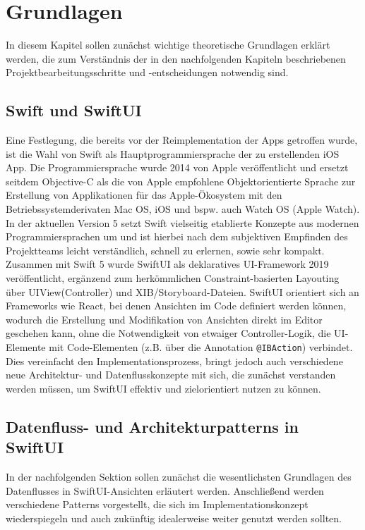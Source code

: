 \chapter{Grundlagen}\label{ch:grundlagen}

In diesem Kapitel sollen zunächst wichtige theoretische Grundlagen erklärt werden, die zum Verständnis der in den nachfolgenden Kapiteln beschriebenen Projektbearbeitungsschritte und -entscheidungen notwendig sind.

\section{Swift und SwiftUI}

Eine Festlegung, die bereits vor der Reimplementation der Apps getroffen wurde, ist die Wahl von Swift als Hauptprogrammiersprache der zu erstellenden iOS App. Die Programmiersprache wurde 2014 von Apple veröffentlicht und ersetzt seitdem Objective-C als die von Apple empfohlene Objektorientierte Sprache zur Erstellung von Applikationen für das Apple-Ökosystem mit den Betriebssystemderivaten Mac OS, iOS und bspw. auch Watch OS (Apple Watch). In der aktuellen Version 5 setzt Swift vielseitig etablierte Konzepte aus modernen Programmiersprachen um und ist hierbei nach dem subjektiven Empfinden des Projektteams leicht verständlich, schnell zu erlernen, sowie sehr kompakt. Zusammen mit Swift 5 wurde SwiftUI als deklaratives UI-Framework 2019 veröffentlicht, ergänzend zum herkömmlichen Constraint-basierten Layouting über UIView(Controller) und XIB/Storyboard-Dateien. SwiftUI orientiert sich an Frameworks wie React, bei denen Ansichten im Code definiert werden können, wodurch die Erstellung und Modifikation von Ansichten direkt im Editor geschehen kann, ohne die Notwendigkeit von etwaiger Controller-Logik, die UI-Elemente mit Code-Elementen (z.B. über die Annotation \texttt{@IBAction}) verbindet. Dies vereinfacht den Implementationsprozess, bringt jedoch auch verschiedene neue Architektur- und Datenflusskonzepte mit sich, die zunächst verstanden werden müssen, um SwiftUI effektiv und zielorientiert nutzen zu können.

\section{Datenfluss- und Architekturpatterns in SwiftUI}

In der nachfolgenden Sektion sollen zunächst die wesentlichsten Grundlagen des Datenflusses in SwiftUI-Ansichten erläutert werden. Anschließend werden verschiedene Patterns vorgestellt, die sich im Implementationskonzept wiederspiegeln und auch zukünftig idealerweise weiter genutzt werden sollten.

